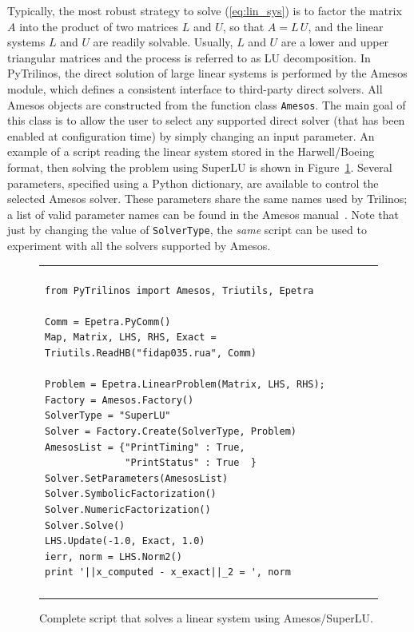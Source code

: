 \documentclass[acmtocl]{acmtrans2m}
\newcommand{\PyTrilinos}{{PyTrilinos}}
\begin{document}
Typically, the most robust strategy to solve (\ref{eq:lin_sys}) is to
factor the matrix $A$ into the product of two matrices $L$ and $U$, so
that $A = L \, U$, and the linear systems $L$ and $U$ are readily
solvable.  Usually, $L$ and $U$ are a lower and upper triangular
matrices and the process is referred to as LU decomposition.  In
\PyTrilinos, the direct solution of large linear systems is performed
by the Amesos module, which defines a consistent interface to
third-party direct solvers.  All Amesos objects are constructed from
the function class {\tt Amesos}.  The main goal of this class is to
allow the user to select any supported direct solver (that has been
enabled at configuration time) by simply changing an input parameter.
An example of a script reading the linear system stored in the
Harwell/Boeing format, then solving the problem using SuperLU is shown
in Figure~\ref{fig:amesos}.  Several parameters, specified using a
Python dictionary, are available to control the selected Amesos
solver.  These parameters share the same names used by Trilinos; a
list of valid parameter names can be found in the Amesos
manual~\cite{Amesos-Reference-Guide}.  Note that just by changing the
value of {\tt SolverType}, the {\sl same} script can be used to
experiment with all the solvers supported by Amesos.

\begin{figure}
  \begin{center}
    \begin{tabular}{| p{12cm} |}
      \hline \\
      \footnotesize
      \begin{minipage}{11.5cm}
\begin{verbatim}
from PyTrilinos import Amesos, Triutils, Epetra

Comm = Epetra.PyComm()
Map, Matrix, LHS, RHS, Exact = Triutils.ReadHB("fidap035.rua", Comm)

Problem = Epetra.LinearProblem(Matrix, LHS, RHS);
Factory = Amesos.Factory()
SolverType = "SuperLU"
Solver = Factory.Create(SolverType, Problem)
AmesosList = {"PrintTiming" : True,
              "PrintStatus" : True  }
Solver.SetParameters(AmesosList)
Solver.SymbolicFactorization()
Solver.NumericFactorization()
Solver.Solve()
LHS.Update(-1.0, Exact, 1.0)
ierr, norm = LHS.Norm2()
print '||x_computed - x_exact||_2 = ', norm
\end{verbatim}
      \end{minipage}
      \\
      \\
      \hline
    \end{tabular}
    \caption{Complete script that solves a linear system using
      Amesos/SuperLU.}
    \label{fig:amesos}
  \end{center}
\end{figure}
\end{document}
